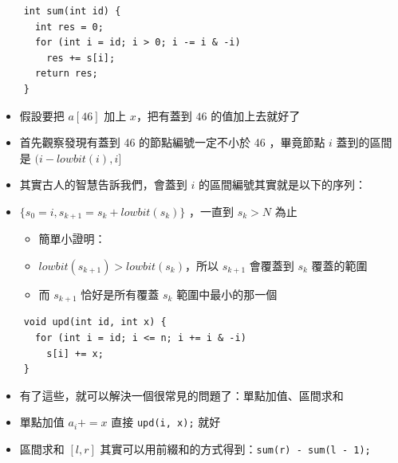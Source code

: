\documentclass[standalone]{beamer}
\begin{document}
\begin{frame}[fragile]{}
  \begin{verbatim}
    int sum(int id) {
      int res = 0;
      for (int i = id; i > 0; i -= i & -i)
        res += s[i];
      return res;
    }
  \end{verbatim}
\end{frame}

\begin{frame}{}
  \begin{itemize}
    \item 假設要把 $a[46]$ 加上 $x$，把有蓋到 $46$ 的值加上去就好了
    \item 首先觀察發現有蓋到 46 的節點編號一定不小於 46 ，畢竟節點 $i$ 蓋到的區間是 $(i-lowbit(i),i]$
    \item 其實古人的智慧告訴我們，會蓋到 $i$ 的區間編號其實就是以下的序列：
    \item $\{s_0 = i, s_{k+1} = s_k + lowbit(s_k)\}$ ，一直到 $s_k > N$ 為止
      \begin{itemize}
        \item 簡單小證明：
        \item $lowbit(s_{k + 1}) > lowbit(s_k)$，所以 $s_{k + 1}$ 會覆蓋到 $s_k$ 覆蓋的範圍
        \item 而 $s_{k + 1}$ 恰好是所有覆蓋 $s_k$ 範圍中最小的那一個
      \end{itemize}
  \end{itemize}
\end{frame}

\begin{frame}[fragile]{}
  \begin{verbatim}
    void upd(int id, int x) {
      for (int i = id; i <= n; i += i & -i)
        s[i] += x;
    }
  \end{verbatim}
\end{frame}

\begin{frame}{}
  \begin{itemize}
    \item 有了這些，就可以解決一個很常見的問題了：單點加值、區間求和
    \item 單點加值 $a_i += x$ 直接 \texttt{upd(i, x);} 就好
    \item 區間求和 $[l, r]$ 其實可以用前綴和的方式得到：\texttt{sum(r) - sum(l - 1);}
  \end{itemize}
\end{frame}
\end{document}
